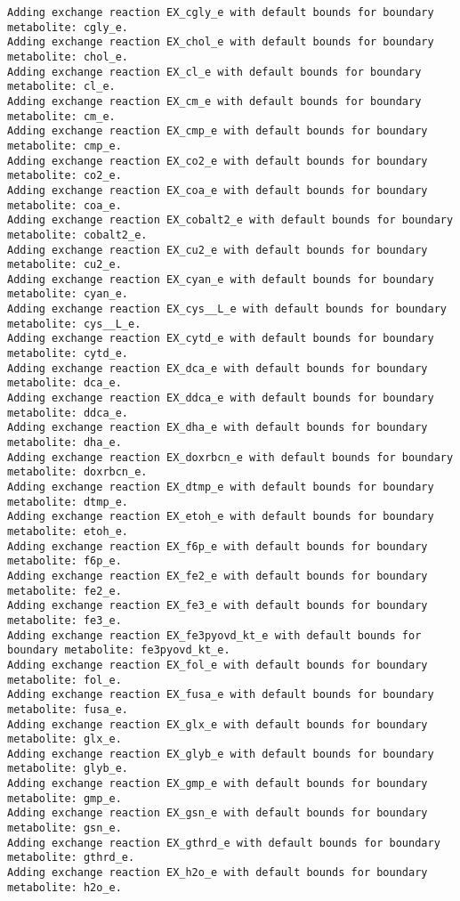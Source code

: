 \documentclass[
  letterpaper,
  DIV=11,
  numbers=noendperiod]{scrartcl}
\begin{document}
\begin{verbatim}
Adding exchange reaction EX_cgly_e with default bounds for boundary metabolite: cgly_e.
Adding exchange reaction EX_chol_e with default bounds for boundary metabolite: chol_e.
Adding exchange reaction EX_cl_e with default bounds for boundary metabolite: cl_e.
Adding exchange reaction EX_cm_e with default bounds for boundary metabolite: cm_e.
Adding exchange reaction EX_cmp_e with default bounds for boundary metabolite: cmp_e.
Adding exchange reaction EX_co2_e with default bounds for boundary metabolite: co2_e.
Adding exchange reaction EX_coa_e with default bounds for boundary metabolite: coa_e.
Adding exchange reaction EX_cobalt2_e with default bounds for boundary metabolite: cobalt2_e.
Adding exchange reaction EX_cu2_e with default bounds for boundary metabolite: cu2_e.
Adding exchange reaction EX_cyan_e with default bounds for boundary metabolite: cyan_e.
Adding exchange reaction EX_cys__L_e with default bounds for boundary metabolite: cys__L_e.
Adding exchange reaction EX_cytd_e with default bounds for boundary metabolite: cytd_e.
Adding exchange reaction EX_dca_e with default bounds for boundary metabolite: dca_e.
Adding exchange reaction EX_ddca_e with default bounds for boundary metabolite: ddca_e.
Adding exchange reaction EX_dha_e with default bounds for boundary metabolite: dha_e.
Adding exchange reaction EX_doxrbcn_e with default bounds for boundary metabolite: doxrbcn_e.
Adding exchange reaction EX_dtmp_e with default bounds for boundary metabolite: dtmp_e.
Adding exchange reaction EX_etoh_e with default bounds for boundary metabolite: etoh_e.
Adding exchange reaction EX_f6p_e with default bounds for boundary metabolite: f6p_e.
Adding exchange reaction EX_fe2_e with default bounds for boundary metabolite: fe2_e.
Adding exchange reaction EX_fe3_e with default bounds for boundary metabolite: fe3_e.
Adding exchange reaction EX_fe3pyovd_kt_e with default bounds for boundary metabolite: fe3pyovd_kt_e.
Adding exchange reaction EX_fol_e with default bounds for boundary metabolite: fol_e.
Adding exchange reaction EX_fusa_e with default bounds for boundary metabolite: fusa_e.
Adding exchange reaction EX_glx_e with default bounds for boundary metabolite: glx_e.
Adding exchange reaction EX_glyb_e with default bounds for boundary metabolite: glyb_e.
Adding exchange reaction EX_gmp_e with default bounds for boundary metabolite: gmp_e.
Adding exchange reaction EX_gsn_e with default bounds for boundary metabolite: gsn_e.
Adding exchange reaction EX_gthrd_e with default bounds for boundary metabolite: gthrd_e.
Adding exchange reaction EX_h2o_e with default bounds for boundary metabolite: h2o_e.

\end{verbatim}
\end{document}
